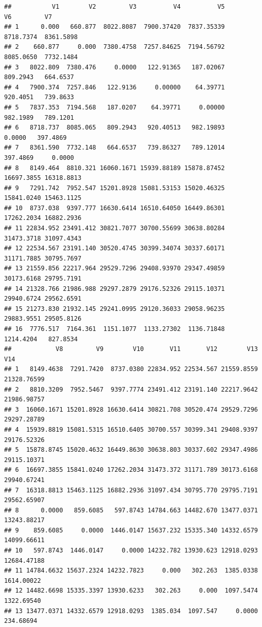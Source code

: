 \documentclass[
]{article}
\begin{document}
\begin{verbatim}
##           V1        V2         V3          V4          V5         V6         V7
## 1      0.000   660.877  8022.8087  7900.37420  7837.35339  8718.7374  8361.5898
## 2    660.877     0.000  7380.4758  7257.84625  7194.56792  8085.0650  7732.1484
## 3   8022.809  7380.476     0.0000   122.91365   187.02067   809.2943   664.6537
## 4   7900.374  7257.846   122.9136     0.00000    64.39771   920.4051   739.8633
## 5   7837.353  7194.568   187.0207    64.39771     0.00000   982.1989   789.1201
## 6   8718.737  8085.065   809.2943   920.40513   982.19893     0.0000   397.4869
## 7   8361.590  7732.148   664.6537   739.86327   789.12014   397.4869     0.0000
## 8   8149.464  8810.321 16060.1671 15939.88189 15878.87452 16697.3855 16318.8813
## 9   7291.742  7952.547 15201.8928 15081.53153 15020.46325 15841.0240 15463.1125
## 10  8737.038  9397.777 16630.6414 16510.64050 16449.86301 17262.2034 16882.2936
## 11 22834.952 23491.412 30821.7077 30700.55699 30638.80284 31473.3718 31097.4343
## 12 22534.567 23191.140 30520.4745 30399.34074 30337.60171 31171.7885 30795.7697
## 13 21559.856 22217.964 29529.7296 29408.93970 29347.49859 30173.6168 29795.7191
## 14 21328.766 21986.988 29297.2879 29176.52326 29115.10371 29940.6724 29562.6591
## 15 21273.830 21932.145 29241.0995 29120.36033 29058.96235 29883.9551 29505.8126
## 16  7776.517  7164.361  1151.1077  1133.27302  1136.71848  1214.4204   827.8534
##            V8         V9        V10       V11       V12        V13         V14
## 1   8149.4638  7291.7420  8737.0380 22834.952 22534.567 21559.8559 21328.76599
## 2   8810.3209  7952.5467  9397.7774 23491.412 23191.140 22217.9642 21986.98757
## 3  16060.1671 15201.8928 16630.6414 30821.708 30520.474 29529.7296 29297.28789
## 4  15939.8819 15081.5315 16510.6405 30700.557 30399.341 29408.9397 29176.52326
## 5  15878.8745 15020.4632 16449.8630 30638.803 30337.602 29347.4986 29115.10371
## 6  16697.3855 15841.0240 17262.2034 31473.372 31171.789 30173.6168 29940.67241
## 7  16318.8813 15463.1125 16882.2936 31097.434 30795.770 29795.7191 29562.65907
## 8      0.0000   859.6085   597.8743 14784.663 14482.670 13477.0371 13243.88217
## 9    859.6085     0.0000  1446.0147 15637.232 15335.340 14332.6579 14099.66611
## 10   597.8743  1446.0147     0.0000 14232.782 13930.623 12918.0293 12684.47188
## 11 14784.6632 15637.2324 14232.7823     0.000   302.263  1385.0338  1614.00022
## 12 14482.6698 15335.3397 13930.6233   302.263     0.000  1097.5474  1322.69540
## 13 13477.0371 14332.6579 12918.0293  1385.034  1097.547     0.0000   234.68694

\end{verbatim}
\end{document}
